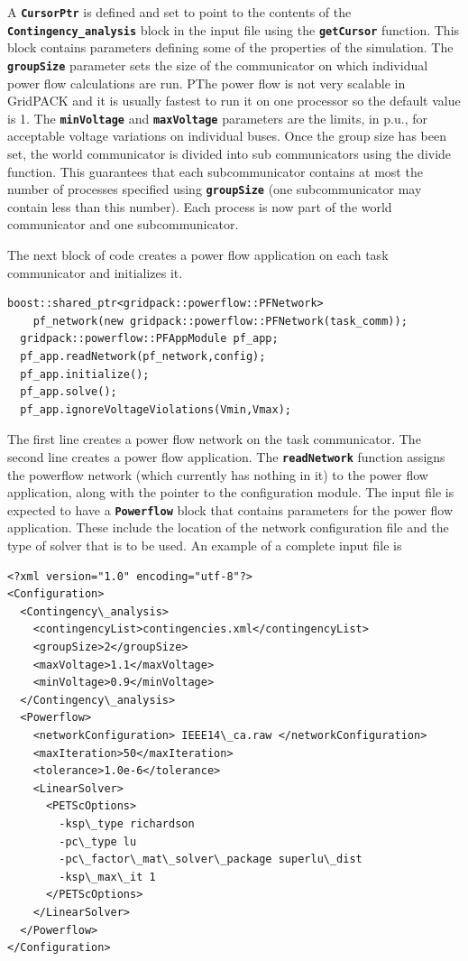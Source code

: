 \documentclass[12pt]{report} %
\begin{document}
A \texttt{\textbf{CursorPtr}} is defined and set to point to the contents of the \texttt{\textbf{Contingency\_analysis}} block in the input file using the \texttt{\textbf{getCursor}} function. This block contains parameters defining some of the properties of the simulation. The \texttt{\textbf{groupSize}} parameter sets the size of the communicator on which individual power flow calculations are run. PThe power flow is not very scalable in GridPACK and it is usually fastest to run it on one processor so the default value is 1. The \texttt{\textbf{minVoltage}} and \texttt{\textbf{maxVoltage}} parameters are the limits, in p.u., for acceptable voltage variations on individual buses. Once the group size has been set, the world communicator is divided into sub communicators using the divide function. This guarantees that each subcommunicator contains at most the number of processes specified using \texttt{\textbf{groupSize}} (one subcommunicator may contain less than this number). Each process is now part of the world communicator and one subcommunicator.

The next block of code creates a power flow application on each task communicator and initializes it.

{
\color{red}
\begin{Verbatim}[fontseries=b]
  boost::shared_ptr<gridpack::powerflow::PFNetwork>
    pf_network(new gridpack::powerflow::PFNetwork(task_comm));
  gridpack::powerflow::PFAppModule pf_app;
  pf_app.readNetwork(pf_network,config);
  pf_app.initialize();
  pf_app.solve();
  pf_app.ignoreVoltageViolations(Vmin,Vmax);
\end{Verbatim}
}

The first line creates a power flow network on the task communicator. The second line creates a power flow application. The \texttt{\textbf{readNetwork}} function assigns the powerflow network (which currently has nothing in it) to the power flow application, along with the pointer to the configuration module. The input file is expected to have a \texttt{\textbf{Powerflow}} block that contains parameters for the  power flow application. These include the location of the network configuration file and the type of solver that is to be used. An example of a complete input file is

{
\color{blue}
\begin{Verbatim}[fontseries=b]
<?xml version="1.0" encoding="utf-8"?>
<Configuration>
  <Contingency\_analysis>
    <contingencyList>contingencies.xml</contingencyList>
    <groupSize>2</groupSize>
    <maxVoltage>1.1</maxVoltage>
    <minVoltage>0.9</minVoltage>
  </Contingency\_analysis>
  <Powerflow>
    <networkConfiguration> IEEE14\_ca.raw </networkConfiguration>
    <maxIteration>50</maxIteration>
    <tolerance>1.0e-6</tolerance>
    <LinearSolver>
      <PETScOptions>
        -ksp\_type richardson
        -pc\_type lu
        -pc\_factor\_mat\_solver\_package superlu\_dist
        -ksp\_max\_it 1
      </PETScOptions>
    </LinearSolver>
  </Powerflow>
</Configuration>
\end{Verbatim}
}
\end{document}
